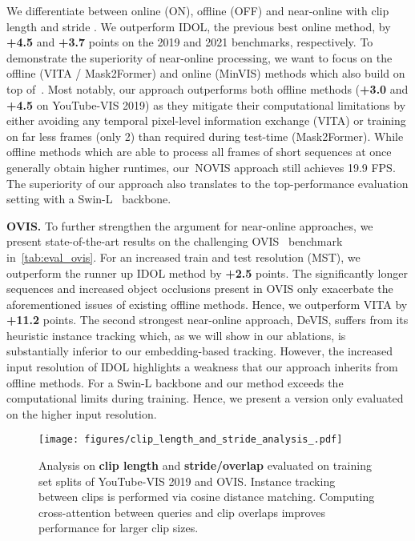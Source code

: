 \documentclass{article}
\newcommand{\method}{\mbox{NOVIS}}
\theoremstyle{plain}
\theoremstyle{definition}
\theoremstyle{remark}
\begin{document}
We differentiate between online (ON), offline (OFF) and near-online with clip length  and stride .
We outperform IDOL, the previous best online method, by \textbf{+4.5} and \textbf{+3.7} points on the 2019 and 2021 benchmarks, respectively.
To demonstrate the superiority of near-online processing, we want to focus on the offline (VITA / Mask2Former) and online (MinVIS) methods which also build on top of~\cite{cheng2021mask2former}.
Most notably, our approach outperforms both offline methods (\textbf{+3.0} and \textbf{+4.5} on YouTube-VIS 2019) as they mitigate their computational limitations by either avoiding any temporal pixel-level information exchange (VITA) or training on far less frames (only 2) than required during test-time (Mask2Former).
While offline methods which are able to process all frames of short sequences at once generally obtain higher runtimes, our~\method{} approach still achieves 19.9 FPS.
The superiority of our approach also translates to the top-performance evaluation setting with a Swin-L~\cite{SwinTransformer} backbone.


\noindent \textbf{OVIS.}
To further strengthen the argument for near-online approaches, we present state-of-the-art results on the challenging OVIS~\cite{ovis} benchmark in~\cref{tab:eval_ovis}.
For an increased train and test resolution (MST), we outperform the runner up IDOL method by \textbf{+2.5} points.
The significantly longer sequences and increased object occlusions present in OVIS only exacerbate the aforementioned issues of existing offline methods.
Hence, we outperform VITA by \textbf{+11.2} points.
The second strongest near-online approach, DeVIS, suffers from its heuristic instance tracking which, as we will show in our ablations, is substantially inferior to our embedding-based tracking.
However, the increased input resolution of IDOL highlights a weakness that our approach inherits from offline methods.
For a Swin-L backbone and  our method exceeds the computational limits during training.
Hence, we present a version only evaluated on the higher input resolution.





\begin{figure}[t]
    \centering
    \texttt{[image: figures/clip\_length\_and\_stride\_analysis\_.pdf]}
    \caption{
        Analysis on \textbf{clip length} and \textbf{stride/overlap} evaluated on training set splits of YouTube-VIS 2019 and OVIS.
Instance tracking between clips is performed via cosine distance matching.
Computing cross-attention between queries and clip overlaps improves performance for larger clip sizes.
        }
    \label{fig:clip_length_and_stride_analysis}
\end{figure} 
\end{document}

